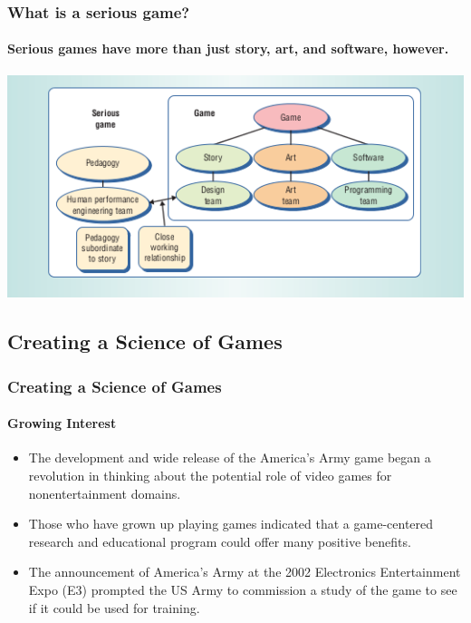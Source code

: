 \begin{frame}
\frametitle{What is a serious game?}
\framesubtitle{Serious games have more than just story, art, and
software, however.}
\begin{center}
\includegraphics[scale=.75]{serious.png}
\end{center}
\end{frame}

\subsection{Creating a Science of Games}

\begin{frame}
\frametitle{Creating a Science of Games}
\framesubtitle{Growing Interest}
\begin{itemize}[<+->]
\item
The development and wide release of the America's Army game began a
\alert{revolution} in thinking about the potential role of video games for
\alert{nonentertainment} domains.
\item
Those who have grown up playing games indicated that a game-centered research
and educational program could offer many positive benefits.
\item
The announcement of America's Army at the 2002 Electronics Entertainment Expo
(E3) prompted the US Army to commission a study of the game to see if it could
be used for training.
\end{itemize}
\end{frame}

